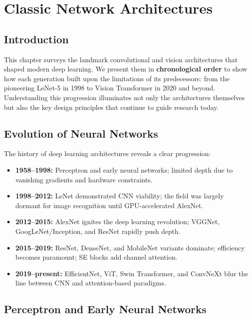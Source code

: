 \clearpage
\cleardoublepage

\chapter{Classic Network Architectures}

\section{Introduction}

This chapter surveys the landmark convolutional and vision architectures that shaped modern deep learning. We present them in \textbf{chronological order} to show how each generation built upon the limitations of its predecessors: from the pioneering LeNet-5 \cite{lecun1998gradient} in 1998 to Vision Transformer \cite{dosovitskiy2020image} in 2020 and beyond. Understanding this progression illuminates not only the architectures themselves but also the key design principles that continue to guide research today.

\section{Evolution of Neural Networks}

The history of deep learning architectures reveals a clear progression:
\begin{itemize}
    \item \textbf{1958--1998:} Perceptron and early neural networks; limited depth due to vanishing gradients and hardware constraints.
    \item \textbf{1998--2012:} LeNet demonstrated CNN viability; the field was largely dormant for image recognition until GPU-accelerated AlexNet.
    \item \textbf{2012--2015:} AlexNet ignites the deep learning revolution; VGGNet, GoogLeNet/Inception, and ResNet rapidly push depth.
    \item \textbf{2015--2019:} ResNet, DenseNet, and MobileNet variants dominate; efficiency becomes paramount; SE blocks add channel attention.
    \item \textbf{2019--present:} EfficientNet, ViT, Swin Transformer, and ConvNeXt blur the line between CNN and attention-based paradigms.
\end{itemize}

\section{Perceptron and Early Neural Networks}

